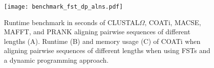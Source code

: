 


\begin{figure}[h!]
    \texttt{[image: benchmark\_fst\_dp\_alns.pdf]}
    \caption{Runtime benchmark in seconds of CLUSTAL$\Omega$, COATi, MACSE,
    MAFFT, and PRANK aligning pairwise sequences of different lengths (A).
    Runtime (B) and memory usage (C) of COATi when aligning pairwise sequences
    of different lengths when using FSTs and a dynamic programming approach.}
    \label{fig:benchmark}
\end{figure}
